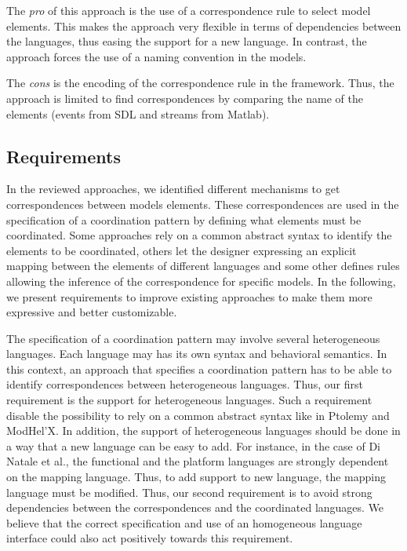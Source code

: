 The \emph{pro} of this approach is the use of a correspondence rule to select model elements. This makes the approach very flexible in terms of dependencies between the languages, thus easing the support for a new language. In contrast, the approach forces the use of a naming convention in the models.     

The \emph{cons} is the encoding of the correspondence rule in the framework. Thus, the approach is limited to find correspondences by comparing the name of the elements (\ie events from SDL and streams from Matlab).



\subsection{Requirements}

In the reviewed approaches, we identified different mechanisms to get correspondences between models elements. These correspondences are used in the specification of a coordination pattern by defining what elements must be coordinated. Some approaches rely on a common abstract syntax to identify the elements to be coordinated, others let the designer expressing an explicit mapping between the elements of different languages and some other defines rules allowing the inference of the correspondence for specific models. In the following, we present requirements to improve existing approaches to make them more expressive and better customizable.  

The specification of a coordination pattern may involve several heterogeneous languages. Each language may has its own syntax and behavioral semantics. In this context, an approach that specifies a coordination pattern has to be able to identify correspondences between heterogeneous languages. Thus, our first requirement is the support for heterogeneous languages. Such a requirement disable the possibility to rely on a common abstract syntax like in Ptolemy and ModHel'X. In addition, the support of heterogeneous languages should be done in a way that a new language can be easy to add. For instance, in the case of Di Natale et al., the functional and the platform languages are strongly dependent on the mapping language. Thus, to add support to new language, the mapping language must be modified. Thus, our second requirement is to avoid strong dependencies between the correspondences and the coordinated languages. We believe that the correct specification and use of an homogeneous language interface could also act positively towards this requirement. 

